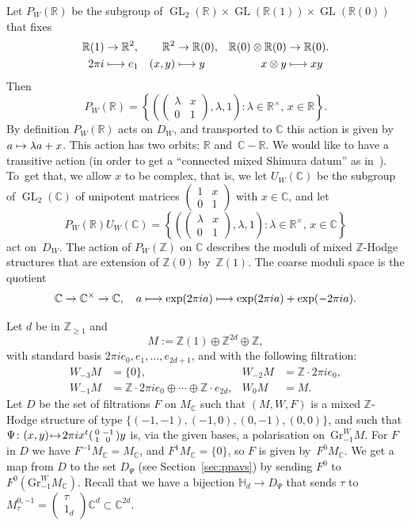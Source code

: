 \documentclass[JEP,XML,SOM,Unicode,NoFloatCountersInSection]{cedram}
\def\mto{\mathchoice{\longmapsto}{\mapsto}{\mapsto}{\mapsto}}
\theoremstyle{plain}
\theoremstyle{definition}
\numberwithin{equation}{subsection}
\renewcommand{\C}{\mathbb C}
\newcommand{\R}{\mathbb R}
\newcommand{\Z}{\mathbb Z}
\renewcommand{\H}{\mathbb H}
\newcommand{\Gr}{\mathrm{Gr}}
\DeclareMathOperator{\GL}{GL}
\begin{document}
Let $P_W(\R)$ be the subgroup of
$\GL_2(\R)\times\GL(\R(1))\times\GL(\R(0))$ that fixes
\begin{align*}
\R(1)&\to\R^2,&
\R^2&\to\R(0),&
\R(0)\otimes\R(0)&\to\R(0).\\
2\pi i&\mto e_1&
(x,y)&\mto y&
x\otimes y&\mto xy
\end{align*}
Then
\[
P_W(\R) =
\left\{\left(\begin{pmatrix}\lambda & x\\0&1\end{pmatrix}, \lambda, 1\right)
: \text{$\lambda\in\R^\times$, $x\in\R$}\right\}.
\]
By definition $P_W(\R)$ acts on $D_W$, and transported to $\C$ this
action is given by $a\mto \lambda a+x$. This action has two orbits:
$\R$ and~$\C-\R$. We would like to have a transitive action (in order
to get a ``connected mixed Shimura datum'' as in~\cite[Def.\,2.1]{Pink1}). To~get
that, we allow $x$ to be complex, that is, we let $U_W(\C)$ be the subgroup
of $\GL_2(\C)$ of unipotent matrices
$(\begin{smallmatrix}1 & x\\0&1\end{smallmatrix})$ with $x\in\C$, and
let
\[
P_W(\R)U_W(\C) =
\left\{\left(\begin{pmatrix}\lambda & x\\0&1\end{pmatrix}, \lambda, 1\right)
: \text{$\lambda\in\R^\times$, $x\in\C$}\right\}
\]
act on~$D_W$. The action of $P_W(\Z)$ on $\C$ describes the moduli of
mixed $\Z$-Hodge structures that are extension of $\Z(0)$
by~$\Z(1)$. The coarse moduli space is the quotient
\[
\C\to\C^\times\to \C, \quad
a\mto \exp(2\pi ia)\mto \exp(2\pi ia)+\exp(-2\pi ia).
\]

\label{sec:uptams}
Let $d$ be in $\Z_{\geq1}$ and
\[
M:=\Z(1)\oplus\Z^{2d}\oplus\Z,
\]
with
standard basis $2\pi i e_0,e_1,\ldots,e_{2d+1}$, and with the
following filtration:
\[
\begin{aligned}
W_{-3}M & =\{0\},& W_{-2}M&=\Z{\cdot}2\pi ie_0, \\
W_{-1}M & =\Z{\cdot}2\pi ie_0\oplus\cdots\oplus\Z{\cdot}e_{2d},
&W_{0}M&=M.
\end{aligned}
\]
Let $D$ be the set of filtrations $F$ on $M_\C$ such that $(M,W,F)$ is
a mixed $\Z$-Hodge structure of type $\{(-1,-1), (-1,0),(0,-1),
(0,0)\}$, and such that $\Psi\colon (x,y)\!\mto\!2\pi i
x^t(\begin{smallmatrix}0 & -1\\1&0\end{smallmatrix})y$ is, via the
given bases, a polarisation on~$\Gr^W_{-1}M$. For $F$ in $D$ we have
$F^{-1}M_\C=M_\C$, and $F^1M_\C=\{0\}$, so $F$ is given
by~$F^0M_\C$. We get a map from $D$ to the set $D_\Psi$
(see Section~\ref{sec:ppavs}) by sending $F^0$ to
$F^0(\Gr^W_{-1}M_\C)$. Recall that we have a bijection $\H_d\to
D_\Psi$ that sends $\tau$ to $M^{0,-1}_\tau=(\substack{\tau \\
1_d})\C^d\subset\C^{2d}$.
\end{document}
